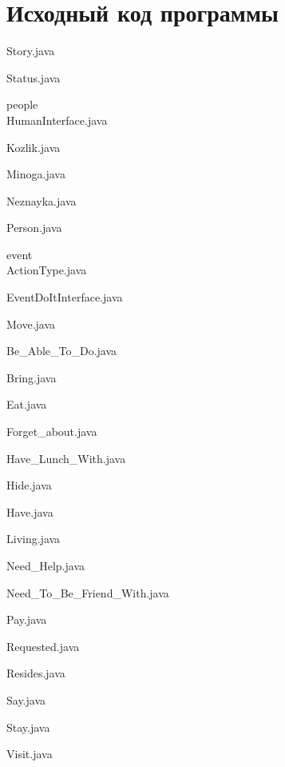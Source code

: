 \documentclass[12pt,onecolumn]{article}
\begin{document}
\section{Исходный код программы}
Story.java

Status.java

people\\
HumanInterface.java

Kozlik.java

Minoga.java

Neznayka.java

Person.java

event\\
ActionType.java

EventDoItInterface.java

Move.java

Be\_Able\_To\_Do.java

Bring.java

Eat.java

Forget\_about.java

Have\_Lunch\_With.java

Hide.java

Have.java

Living.java

Need\_Help.java

Need\_To\_Be\_Friend\_With.java

Pay.java

Requested.java

Resides.java

Say.java

Stay.java

Visit.java

\end{document}
